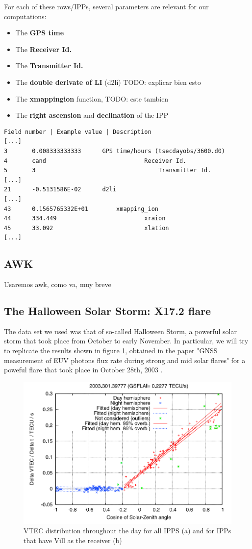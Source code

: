 For each of these rows/IPPs, several parameters are relevant for our computations:


\begin{itemize}
\item The \textbf{GPS time}
\item The \textbf{Receiver Id.}
\item The \textbf{Transmitter Id.}
\item The \textbf{double derivate of LI} (d2li) TODO: explicar bien esto
\item The \textbf{xmappingion} function, TODO: este tambien
\item The \textbf{right ascension} and \textbf{declination} of the IPP
\end{itemize}

\begin{lstlisting}[caption=Format of the ti file]
Field number | Example value | Description
[...]
3 		0.008333333333		GPS time/hours (tsecdayobs/3600.d0)
4 		cand							Receiver Id.
5 		3									Transmitter Id.
[...]
21 		-0.5131586E-02		d2li
[...]
43 		0.1565765332E+01		xmapping_ion
44 		334.449							xraion
45 		33.092							xlation
[...]
\end{lstlisting}

\subsection{AWK}

Usaremos awk, como va, muy breve

\subsection{The Halloween Solar Storm: X17.2 flare}

The data set we used was that of so-called Halloween Storm, a powerful solar storm that took place from October to early November. In particular, we will try to replicate the results shown in figure \ref{fig:halloweenPaper}, obtained in the paper "GNSS measurement of EUV photons flux rate during strong and mid solar flares" for a poweful flare that took place in October 28th, 2003 \cite{hernandez2012gnss}.

\begin{figure}[!htb]
	\includegraphics[width=0.5\linewidth]{images/ch4/halloweenPaper.png}
	\caption{VTEC distribution throughout the day for all IPPS (a) and for IPPs that have Vill as the receiver (b)}
	\label{fig:halloweenPaper}
\end{figure}

